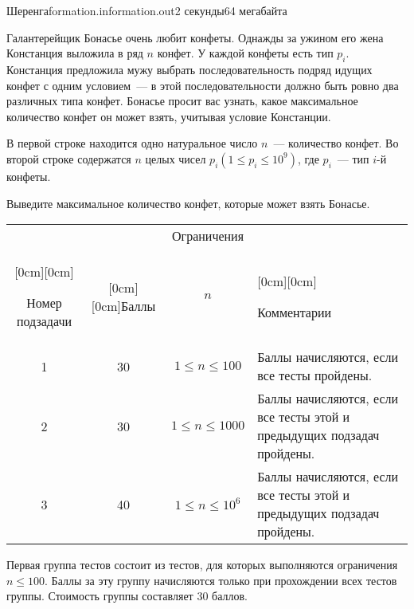 \begin{problem}{Шеренга}{formation.in}{formation.out}{2 секунды}{64 мегабайта}

Галантерейщик Бонасье очень любит конфеты.
Однажды за ужином его жена Констанция выложила в ряд $n$ конфет.
У каждой конфеты есть тип $p_i$.
Констанция предложила мужу выбрать последовательность подряд идущих конфет с одним условием~--- в этой последовательности должно быть ровно два различных типа конфет.
Бонасье просит вас узнать, какое максимальное количество конфет он может взять, учитывая условие Констанции.


\InputFile
В первой строке находится одно натуральное число $n$~--- количество конфет.
Во второй строке содержатся $n$ целых чисел $p_i (1 \le p_i \le 10^9)$, где $p_i$~--- тип $i$-й конфеты.

\OutputFile
Выведите максимальное количество конфет, которые может взять Бонасье.

\begingroup
\begin{center}
\begin{flushleft}\Scoring\end{flushleft}
\renewcommand{\arraystretch}{1.5}
\begin{tabular}{|c|c|c|p{8.2cm}|}
\hline
& & \multicolumn{1}{c|}{Ограничения} & \\
\cline{3-3}
\raisebox{2.25ex}[0cm][0cm]{\parbox{1.6cm}{\begin{center} Номер подзадачи\end{center}}} & 
\raisebox{2.25ex}[0cm][0cm]{Баллы} &
$n$ & \raisebox{2.25ex}[0cm][0cm]{\parbox{8.2cm}{\begin{center} Комментарии\end{center}}} 
\\ \hline
1   & 30 & $1 \le n \le 100$ & Баллы начисляются, если все тесты пройдены.
\\ \hline
2   & 30 & $1 \le n \le 1000$  & Баллы начисляются, если все тесты этой и предыдущих подзадач пройдены.
\\ \hline
3   & 40 & $1 \le n \le 10^6$ & Баллы начисляются, если все тесты этой и предыдущих подзадач пройдены.
\\ \hline
\end{tabular}
\end{center}
\endgroup

Первая группа тестов состоит из тестов, для которых выполняются ограничения $n \le 100$. Баллы за эту группу начисляются только при прохождении всех тестов группы. Стоимость группы составляет 30 баллов.


\end{problem}
